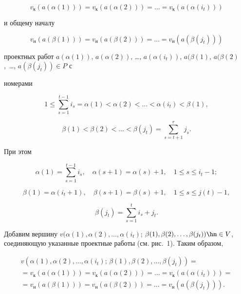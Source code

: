 $$

v _{\text{к}}(a(\alpha(1)))= v

_{\text{к}}(a(\alpha(2)))=\dots=v_{\text{к}}(a(\alpha(i_t )))

$$

и общему началу

$$

v _{\text{н}}(a(\beta(1)))= v

_{\text{н}}(a(\beta(2)))=\dots=v_{\text{н}}(a(\beta(j_t )))

$$

проектных работ $a(\alpha(1))$, $a(\alpha(2))$, \dots, $a(\alpha(i_t

))$, $a(\beta (1)$, $a(\beta (2)$,~\dots, $a(\beta (j_t ))\in P$ с

номерами

$$

1\leq \sum ^{t-1}_{s=1}i_{s}=\alpha(1)<\alpha(2)<\dots<\alpha(i_t

)<\beta (1),

$$

$$

\beta (1)<\beta (2)<\dots<\beta (j_t)=\sum^{r}_{s=t+1}j_{s}.

$$

При этом

$$

\alpha(1)= \sum ^{t-1}_{s=1}i_{s}, \quad \alpha(s+1)=

\alpha(s)+1,\quad 1\leq s \leq i_t -1;$$

$$\beta(1)=\alpha(i_t +1),\quad  \beta (s+1)=\beta (s)+1,\quad 1\leq s \leq j(t)-1,$$

$$\beta (j_t )= \sum^{t}_{s=1}i_{s}+j_t .$$



Добавим вершину $v (\alpha(1), \alpha(2), \dots, \alpha(i_t)$; $\beta(1), \beta(2), \dots, \beta(j_t))\hm \in V$, соединяющую указанные проектные работы (см. рис.~1). Таким образом,

\begin{multline*}

v (\alpha(1), \alpha(2), \dots, \alpha(i_t);\, \beta(1), \beta(2), \dots, \beta(j_t))=\\

= v_{\text{к}}(a(\alpha(1))) = v_{\text{к}}(a(\alpha(2)))= \dots =v

_{\text{к}}(a(\alpha(i_t ))) = \\ = v_{\text{н}}(a(\beta (1))) =

v_{\text{н}}(a(\beta (2)))= \dots =v _{\text{н}}(a(\beta (j_t ))).

\end{multline*}





